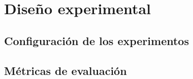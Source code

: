 \chapter{Diseño experimental} \label{chap:experimentacion}


\section{Configuración de los experimentos} \label{sec:configuracion_experimentos}


\section{Métricas de evaluación} \label{sec:metricas_evaluacion}
